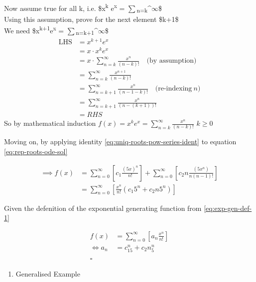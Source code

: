 \documentclass[11pt]{article}
\begin{document}
\begin{enumerate}
Now assume true for all k, i.e. \$x\textsuperscript{k} e\textsuperscript{x} = \(\sum\)\textsubscript{n=k}\^{}\(\infty\)\$\\
Using this assumption, prove for the next element \$k+1\$\\
We need \$x\textsuperscript{k+1}e\textsuperscript{x} = \(\sum\)\textsubscript{n=k+1}\^{}\(\infty\)\$\\
\begin{align*}
    \text{LHS} &= x^{k+1}e^x\\
    &= x\cdot x^{k}e^x\\
    &= x\cdot \sum_{n=k}^\infty\frac{x^n}{(n-k)!} \quad \text{(by assumption)}\\
    &= \sum_{n=k}^\infty\frac{x^{n+1}}{(n-k)!}\\
    &= \sum_{n=k+1}^\infty\frac{x^n}{(n-1-k)!} \quad \text{(re-indexing}~ n\text{)}\\
    &= \sum_{n=k+1}^\infty\frac{x^n}{(n-(k+1))!}\\
    &= RHS
\end{align*}
So by mathematical induction \(f(x) = x^ke^x = \sum_{n=k}^\infty\frac{x^n}{(n-k)!}\)  \(k \ge 0\)

Moving on, by applying identity \eqref{eq:uniq-roots-pow-series-ident} to equation \eqref{eq:rep-roots-ode-sol}

\begin{align}
    \implies  f{\left({ x }\right)} &= \sum^{\infty}_{n= 0}   {\left[{ c_1 \frac{{\left({ 5x }\right)}^n}{n!} }\right]}  +  \sum^{\infty}_{n= 0}   {\left[{ c_2 n \frac{{\left({ 5x^n }\right)}}{n{\left({ n-1 }\right)}!} }\right]} \nonumber \\
 &= \sum^{\infty}_{n= 0}   {\left[{ \frac{x^n}{n!} {\left({ c_{1}5^n +  c_2 n 5^n   }\right)} }\right]} \nonumber
\end{align}

Given the defenition of the exponential generating function from \eqref{eq:exp-gen-def-1}

\begin{align}
    f{\left({ x }\right)}&=     \sum^{\infty}_{n= 0}   {\left[{ a_n \frac{x^n}{n!} }\right]} \nonumber \\
    \iff a_n &= c_{15}^n +  c_2n_5^n \nonumber \\ \nonumber
    \ \nonumber \\
    \square \nonumber
\end{align}
\begin{enumerate}
\item Generalised Example
\label{sec:orgab372c4}


\end{enumerate}
\end{enumerate}
\end{document}
